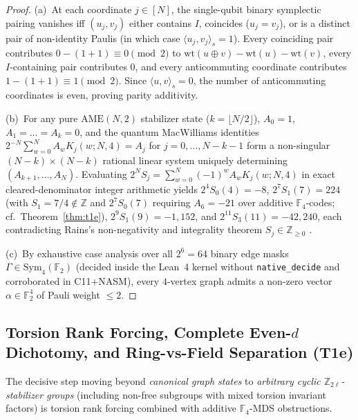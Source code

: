 \documentclass[11pt,reqno]{amsart}
\theoremstyle{definition}
\newcommand{\ZZ}{\mathbb{Z}}
\newcommand{\FF}{\mathbb{F}}
\newcommand{\AME}{\mathrm{AME}}
\newcommand{\lid}[1]{{\footnotesize\nolinkurl{#1}}}
\begin{document}
\begin{proof}
(a)~At each coordinate $j \in [N]$, the single-qubit binary symplectic pairing vanishes
iff $(u_j, v_j)$ either contains $I$, coincides ($u_j = v_j$), or is a distinct pair of
non-identity Paulis (in which case $\langle u_j, v_j\rangle_s = 1$). Every coinciding pair
contributes $0 - (1+1) \equiv 0 \pmod 2$ to $\mathrm{wt}(u \oplus v) - \mathrm{wt}(u) -
\mathrm{wt}(v)$, every $I$-containing pair contributes $0$, and every anticommuting
coordinate contributes $1 - (1+1) \equiv 1 \pmod 2$. Since $\langle u, v\rangle_s = 0$,
the number of anticommuting coordinates is even, proving parity additivity.

(b)~For any pure $\AME(N, 2)$ stabilizer state ($k = \lfloor N/2 \rfloor$), $A_0 = 1$,
$A_1 = \dots = A_k = 0$, and the quantum MacWilliams identities $2^{-N}\sum_{w=0}^N A_w
K_j(w; N, 4) = A_j$ for $j = 0, \dots, N - k - 1$ form a non-singular $(N-k) \times
(N-k)$ rational linear system uniquely determining $(A_{k+1}, \dots, A_N)$. Evaluating
$2^N S_j = \sum_{w=0}^N (-1)^w A_w K_j(w; N, 4)$ in exact cleared-denominator integer
arithmetic yields $2^4 S_0(4) = -8$, $2^7 S_1(7) = 224$ (with $S_1 = 7/4 \notin \ZZ$ and
$2^7 S_0(7)$ requiring $A_6 = -21$ over additive $\FF_4$-codes; cf.\ Theorem~\ref{thm:t1e}),
$2^9 S_1(9) = -1{,}152$, and $2^{11} S_3(11) = -42{,}240$, each contradicting Rains's
non-negativity and integrality theorem $S_j \in \mathbb{Z}_{\ge 0}$ \cite{rains1998shadow}.

(c)~By exhaustive case analysis over all $2^6 = 64$ binary edge masks $\Gamma \in
\mathrm{Sym}_4(\FF_2)$ (decided inside the Lean~4 kernel without
\lid{native_decide} and corroborated in C11+NASM), every $4$-vertex graph admits a
non-zero vector $\alpha \in \FF_2^4$ of Pauli weight $\le 2$.
\end{proof}

\subsection{Torsion Rank Forcing, Complete Even-\texorpdfstring{$d$}{d} Dichotomy, and Ring-vs-Field Separation (T1e)}

The decisive step moving beyond \emph{canonical graph states} \cite{wojcik2026ame} to
\emph{arbitrary cyclic $\ZZ_{2\ell}$-stabilizer groups} (including non-free subgroups
with mixed torsion invariant factors) is torsion rank forcing combined with additive
$\FF_4$-MDS obstructions.
\end{document}
